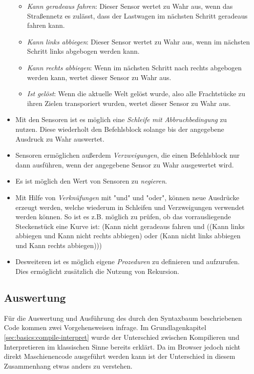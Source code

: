 \begin{itemize}
\begin{itemize}
    \item \emph{Kann geradeaus fahren}: Dieser Sensor wertet zu Wahr aus, wenn das Straßennetz es zulässt, dass der Lastwagen im nächsten Schritt geradeaus fahren kann.
    \item \emph{Kann links abbiegen}: Dieser Sensor wertet zu Wahr aus, wenn im nächsten Schritt links abgebogen werden kann.
    \item \emph{Kann rechts abbiegen}: Wenn im nächsten Schritt nach rechts abgebogen werden kann, wertet dieser Sensor zu Wahr aus.
    \item \emph{Ist gelöst}: Wenn die aktuelle Welt gelöst wurde, also alle Frachtstücke zu ihren Zielen transporiert wurden, wertet dieser Sensor zu Wahr aus.
  \end{itemize}
  \item Mit den Sensoren ist es möglich eine \emph{Schleife mit Abbruchbedingung} zu nutzen. Diese wiederholt den Befehlsblock solange bis der angegebene Ausdruck zu Wahr auswertet.
  \item Sensoren ermöglichen außerdem \emph{Verzweigungen}, die einen Befehlsblock nur dann ausführen, wenn der angegebene Sensor zu Wahr ausgewertet wird.
  \item Es ist möglich den Wert von Sensoren zu \emph{negieren}.
  \item Mit Hilfe von \emph{Verknüfungen} mit "und" und "oder", können neue Ausdrücke erzeugt werden, welche wiederum in Schleifen und Verzweigungen verwendet werden können. So ist es z.B. möglich zu prüfen, ob das vorrausliegende Steckenstück eine Kurve ist: (Kann nicht geradeaus fahren und ((Kann links abbiegen und Kann nicht rechts abbiegen) oder (Kann nicht links abbiegen und Kann rechts abbiegen)))
  \item Desweiteren ist es möglich eigene \emph{Prozeduren} zu definieren und aufzurufen. Dies ermöglicht zusätzlich die Nutzung von Rekursion.
\end{itemize}

\subsection{Auswertung}

Für die Auswertung und Ausführung des durch den Syntaxbaum beschriebenen Code kommen zwei Vorgehensweisen infrage. Im Grundlagenkapitel \ref{sec:basics:compile-interpret} wurde der Unterschied zwischen Kompilieren und Interpretieren im klassischen Sinne bereits erklärt. Da im Browser jedoch nicht direkt Maschienencode ausgeführt werden kann ist der Unterschied in diesem Zusammenhang etwas anders zu verstehen.

